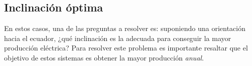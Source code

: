 \subsection{Inclinación óptima}

En estos casos, una de las preguntas a resolver es: suponiendo una
orientación hacia el ecuador, ¿qué inclinación es la adecuada para
conseguir la mayor producción eléctrica? Para resolver este problema
es importante resaltar que el objetivo de estos sistemas es obtener
la mayor producción \emph{anual}. 







